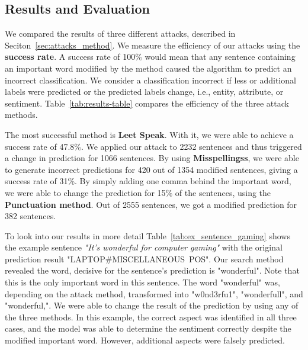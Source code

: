 \subsection{Results and Evaluation}
We compared the results of three different attacks, described in Seciton~\ref{sec:attacks_method}. We measure the efficiency of our attacks using the \textbf{success rate}. 
A success rate of 100\% would mean that any sentence containing an important word modified by the method caused the algorithm to predict an incorrect classification. We consider a classification incorrect if less or additional labels were predicted or the predicted labels change, i.e., entity, attribute, or sentiment. Table~\ref{tab:results-table} compares the efficiency of the three attack methods.


The most successful method is \textbf{Leet Speak}. With it, we were able to achieve a success rate of 47.8\%. We applied our attack to 2232 sentences and thus triggered a change in prediction for 1066 sentences. By using \textbf{Misspellingss}, we were able to generate incorrect predictions for 420 out of 1354 modified sentences, giving a success rate of 31\%. By simply adding one comma behind the important word, we were able to change the prediction for 15\% of the sentences, using the \textbf{Punctuation method}. Out of 2555 sentences, we got a modified prediction for 382 sentences.

To look into our results in more detail Table~\ref{tab:ex_sentence_gaming} shows the example sentence \textit{"It's wonderful for computer gaming"} with the original prediction result "LAPTOP\#MISCELLANEOUS~POS". Our search method revealed the word, decisive for the sentence's prediction is "wonderful". Note that this is the only important word in this sentence. The word "wonderful" was, depending on the attack method, transformed into "w0nd3rfu1", "wonderfull", and "wonderful,". We were able to change the result of the prediction by using any of the three methods. In this example, the correct aspect was identified in all three cases, and the model was able to determine the sentiment correctly despite the modified important word. However, additional aspects were falsely predicted. 


